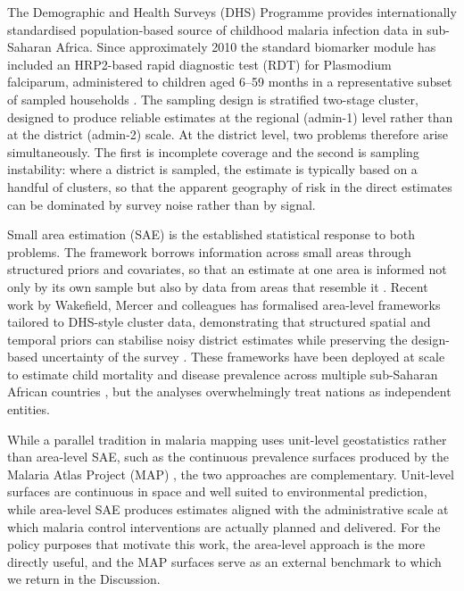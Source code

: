 \documentclass{article}
\begin{document}
The Demographic and Health Surveys (DHS) Programme provides
internationally standardised population-based source of childhood
malaria infection data in sub-Saharan Africa. Since approximately 2010
the standard biomarker module has included an HRP2-based rapid
diagnostic test (RDT) for Plasmodium falciparum, administered to
children aged 6--59 months in a representative subset of sampled
households \citep{florey2014, croft2018}. The sampling design is
stratified two-stage cluster, designed to produce reliable estimates at
the regional (admin-1) level rather than at the district (admin-2)
scale. At the district level, two problems therefore arise
simultaneously. The first is incomplete coverage and the second is
sampling instability: where a district is sampled, the estimate is
typically based on a handful of clusters, so that the apparent geography
of risk in the direct estimates can be dominated by survey noise rather
than by signal.

Small area estimation (SAE) is the established statistical response to
both problems. The framework borrows information across small areas
through structured priors and covariates, so that an estimate at one
area is informed not only by its own sample but also by data from areas
that resemble it \citep{rao2015}. Recent work by Wakefield, Mercer and
colleagues has formalised area-level frameworks tailored to DHS-style
cluster data, demonstrating that structured spatial and temporal priors
can stabilise noisy district estimates while preserving the design-based
uncertainty of the survey \citep{mercer2015, wakefield2020}. These
frameworks have been deployed at scale to estimate child mortality and
disease prevalence across multiple sub-Saharan African countries
\citep{wakefield2019}, but the analyses overwhelmingly treat nations as
independent entities.

While a parallel tradition in malaria mapping uses unit-level
geostatistics rather than area-level SAE, such as the continuous
prevalence surfaces produced by the Malaria Atlas Project (MAP)
\citep{gething2011, bhatt2015, weiss2020}, the two approaches are
complementary. Unit-level surfaces are continuous in space and well
suited to environmental prediction, while area-level SAE produces
estimates aligned with the administrative scale at which malaria control
interventions are actually planned and delivered. For the policy
purposes that motivate this work, the area-level approach is the more
directly useful, and the MAP surfaces serve as an external benchmark to
which we return in the Discussion.
\end{document}
